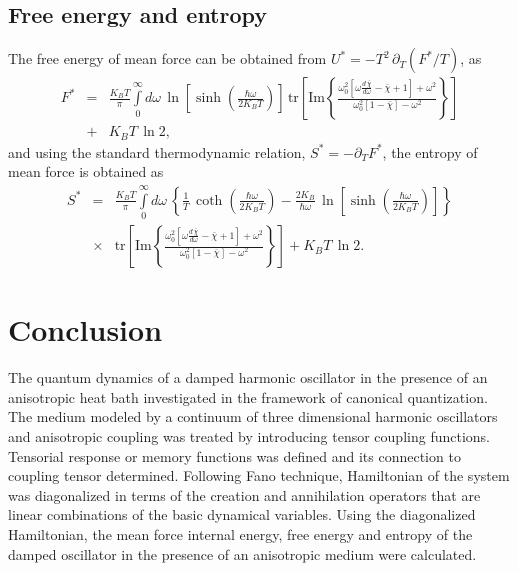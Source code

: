 \documentclass[preprint,showpacs,showkeys,groupedaddress,superscriptaddress]{revtex4}
\begin{document}
\subsection{Free energy and entropy}
\noindent The free energy of mean force can be obtained from $U^*=-T^2 \,\partial_T (F^* /T)$, as
\begin{eqnarray}
F^* &=& \frac{K_B T}{\pi}\int\limits_0^\infty d\omega\, \ln \left[\sinh \left(\frac{\hbar \omega}{2K_B T} \right) \right]\,\mbox{tr}\left[\mbox{Im}
\left\{\frac{\omega_0^2 \left[\omega\frac{d\,\bar{\chi}}{d\omega}- \bar{\chi}+ 1 \right] + \omega^2 }{\omega_0^2
[1-\bar{\chi}]-\omega^2}\right\}\right]\nonumber\\
&+& K_B T\,\ln 2,
\end{eqnarray}
and using the standard thermodynamic relation, $S^*=-\partial_T F^*$, the entropy of mean force is obtained as
\begin{eqnarray}
S^* &=& \frac{K_B T}{\pi}\int\limits_0^\infty d\omega\, \left\{\frac{1}{T}\,\coth\left(\frac{\hbar \omega}{2 K_B T}\right)-\frac{2 K_B}{\hbar \omega}\,
\ln \left[\sinh\left(\frac{\hbar \omega}{2 K_B T}\right)\right] \right\}\nonumber\\
&\times & \mbox{tr}\left[\mbox{Im}
\left\{\frac{\omega_0^2 \left[\omega\frac{d\,\bar{\chi}}{d\omega}- \bar{\chi}+ 1 \right] + \omega^2 }{\omega_0^2
[1-\bar{\chi}]-\omega^2}\right\}\right]+ K_B T\,\ln 2.
\end{eqnarray}
\section{Conclusion}
\noindent The quantum dynamics of a damped harmonic oscillator in the presence of an anisotropic heat bath investigated in the framework of canonical quantization. The medium modeled by a continuum of three dimensional harmonic oscillators and anisotropic coupling was treated by introducing tensor coupling functions. Tensorial response or memory functions was defined and its connection to coupling tensor determined. Following Fano technique, Hamiltonian of the system was diagonalized in terms of the creation and annihilation operators that are linear combinations of the basic dynamical variables. Using the diagonalized Hamiltonian, the mean force internal energy, free energy and entropy of the damped oscillator in the presence of an anisotropic medium were calculated.
\end{document}

